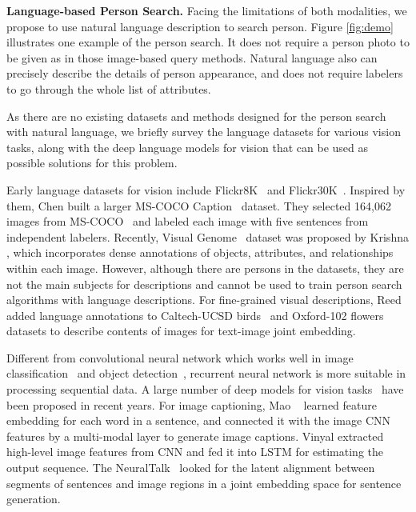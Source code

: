 \textbf{Language-based Person Search.} Facing the limitations of both modalities, we propose to use natural language description to search person. Figure \ref{fig:demo} illustrates one example of the person search. It does not require a person photo to be given as in those image-based query methods. Natural language also can precisely describe the details of person appearance, and does not require labelers to go through the whole list of attributes. 

As there are no existing datasets and methods designed for the person search with natural language, we briefly survey the language datasets for various vision tasks, along with the deep language models for vision that can be used as possible solutions for this problem.

Early language datasets for vision include Flickr8K~\cite{hodosh2013framing} and Flickr30K~\cite{young2014image}.
Inspired by them, Chen \etal built a larger MS-COCO Caption~\cite{chen2015microsoft} dataset. They selected 164,062 images from MS-COCO~\cite{lin2014microsoft} and labeled each image with five sentences from independent labelers.
Recently, Visual Genome~\cite{krishna2016visual} dataset was proposed by Krishna \etal, which incorporates dense annotations of objects, attributes, and relationships within each image. However, although there are persons in the datasets, they are not the main subjects for descriptions and cannot be used to train person search algorithms with language descriptions. For fine-grained visual descriptions, Reed \etal added language annotations to Caltech-UCSD birds~\cite{welinder2010caltech} and Oxford-102 flowers~\cite{nilsback2008automated} datasets to describe contents of images for text-image joint embedding.

Different from convolutional neural network which works well in image classification~\cite{krizhevsky2012imagenet,he2016deep} and object detection~\cite{kang2016object,kang2016t,kang2017object}, recurrent neural network is more suitable in processing sequential data. A large number of deep models for vision tasks~\cite{xu2015show,antol2015vqa,hu2016segmentation,johnson2015densecap,gao2015you,chen2014learning,fang2015captions} have been proposed in recent years. For image captioning, Mao \etal~\cite{mao2014deep} learned feature embedding for each word in a sentence, and connected it with the image CNN features by a multi-modal layer to generate image captions. Vinyal \etal \cite{vinyals2015show} extracted high-level image features from CNN and fed it into LSTM for estimating the output sequence. The NeuralTalk~\cite{karpathy2015deep} looked for the latent alignment between segments of sentences and image regions in a joint embedding space for sentence generation.

